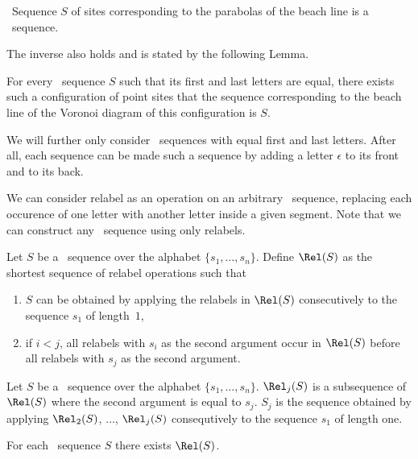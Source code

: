 \begin{lemma}\
	Sequence $S$ of sites corresponding to the parabolas of the beach line is a \Ds~sequence.
\end{lemma}

The inverse also holds and is stated by the following Lemma.

\begin{lemma}[\cite{sadavschi}] \label{lm:dsparab}
	For every \Ds~sequence $S$ such that its first and last letters are equal, there exists such a configuration of point sites that the sequence corresponding to the beach line of the Voronoi diagram of this configuration is $S$.
\end{lemma}

We will further only consider \Ds~sequences with equal first and last letters. After all, each sequence can be made such a sequence by adding a letter $\epsilon$ to its front and to its back.

We can consider relabel as an operation on an arbitrary \Ds~sequence, replacing each occurence of one letter with another letter inside a given segment. Note that we can construct any \Ds~sequence using only relabels.

\begin{definition}
	Let $S$ be a \Ds~sequence over the alphabet $\{ s_1, \ldots, s_n \}$. Define $\Rel(S)$ as the shortest sequence of relabel operations such that\begin{enumerate}
	\item $S$ can be obtained by applying the relabels in $\Rel(S)$ consecutively to the sequence $s_1$ of length~$1$,
	\item if $i < j$, all relabels with $s_i$ as the second argument occur in $\Rel(S)$ before all relabels with $s_j$ as the second argument.\end{enumerate}
\end{definition}

\begin{definition}
	Let $S$ be a \Ds~sequence over the alphabet $\{ s_1, \ldots, s_n \}$. $\Rel_j (S)$ is a subsequence of $\Rel (S)$ where the second argument is equal to $s_j$. $S_j$ is the \Ds sequence obtained by applying $\Rel_2 (S)$, $\ldots$, $\Rel_j (S)$ consequtively to the sequence $s_1$ of length one.
\end{definition}

\begin{lemma}
	For each \Ds~sequence $S$ there exists $\Rel(S)$.
\end{lemma}

